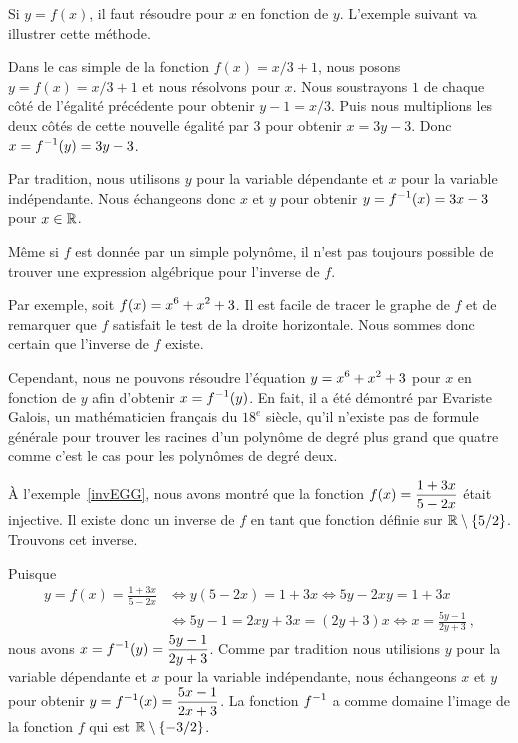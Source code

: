 {Si $y=f(x)$, il faut résoudre pour $x$ en fonction de $y$.  L'exemple
suivant va illustrer cette méthode.

\begin{egg}
Dans le cas simple de la fonction $f(x) = x/3 +1$, nous posons
$y = f(x) = x/3 +1$ et nous résolvons pour $x$.  Nous soustrayons $1$
de chaque côté de l'égalité précédente pour obtenir $y - 1 =  x/3$.
Puis nous multiplions les deux côtés de cette nouvelle égalité par $3$
pour obtenir $x = 3y - 3$.  Donc $\displaystyle x=f^{-1}(y) = 3y-3$.

Par tradition, nous utilisons $y$ pour la variable dépendante et
$x$ pour la variable indépendante.  Nous échangeons donc $x$ et $y$ pour
obtenir $\displaystyle y = f^{-1}(x) = 3 x - 3$ pour $x\in \mathbb{R}$.
\end{egg}

\begin{egg}
Même si $f$ est donnée par un simple polynôme, il n'est pas toujours
possible de trouver une expression algébrique pour l'inverse de $f$.

Par exemple, soit $\displaystyle f(x) = x^6 + x^2 + 3$.  Il est facile de tracer le
graphe de $f$ et de remarquer que $f$ satisfait le test de la droite
horizontale.  Nous sommes donc certain que l'inverse de $f$ existe.

Cependant, nous ne pouvons résoudre l'équation $\displaystyle y=x^6+x^2+3$ pour $x$
en fonction de $y$ afin d'obtenir $\displaystyle x = f^{-1}(y)$.  En fait, il a été
démontré par Evariste Galois, un mathématicien français du $18^e$
siècle, qu'il n'existe pas de formule générale pour trouver les
racines d'un polynôme de degré plus grand que quatre comme c'est le
cas pour les polynômes de degré deux.
\end{egg}

\begin{egg}
À l'exemple~\ref{invEGG}, nous avons montré que la fonction
$\displaystyle f(x) = \frac{1+3x}{5-2x}$ était injective.  Il existe
donc un inverse de $f$ en tant que fonction définie sur
$\mathbb{R}\setminus \{5/2\}$.  Trouvons cet inverse.

Puisque
\begin{align*}
y = f(x) = \frac{1+3x}{5-2x} &
\Leftrightarrow y(5-2x) = 1+3x \Leftrightarrow 5y -2xy = 1 + 3x \\
&\Leftrightarrow 5y -1 = 2xy + 3x = (2y+3)x
\Leftrightarrow x = \frac{5y -1}{2y+3} \ ,
\end{align*}
nous avons $\displaystyle x=f^{-1}(y) = \frac{5y -1}{2y+3}$.  Comme par
tradition nous utilisions $y$ pour la variable dépendante et $x$
pour la variable indépendante, nous échangeons $x$ et $y$ pour obtenir
$\displaystyle y=f^{-1}(x) = \frac{5x -1}{2x+3}$.  La fonction
$\displaystyle f^{-1}$ a comme domaine l'image de la fonction $f$ qui est
$\mathbb{R} \setminus \{-3/2\}$.
\end{egg}

}
